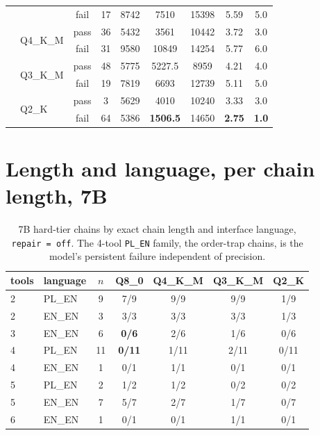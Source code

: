 \documentclass[11pt]{article}
\begin{document}
\begin{table}[h]
\begin{tabular}{llccccccc}
 &                          & fail & 17 & 8742 & 7510 & 15398 & 5.59 & 5.0 \\
 & \multirow{2}{*}{Q4\_K\_M} & pass & 36 & 5432 & 3561 & 10442 & 3.72 & 3.0 \\
 &                          & fail & 31 & 9580 & 10849& 14254 & 5.77 & 6.0 \\
 & \multirow{2}{*}{Q3\_K\_M} & pass & 48 & 5775 & 5227.5 & 8959  & 4.21 & 4.0 \\
 &                          & fail & 19 & 7819 & 6693 & 12739 & 5.11 & 5.0 \\
 & \multirow{2}{*}{Q2\_K}   & pass & 3  & 5629 & 4010 & 10240 & 3.33 & 3.0 \\
 &                          & fail & 64 & 5386 & \textbf{1506.5} & 14650 & \textbf{2.75} & \textbf{1.0} \\
\bottomrule
\end{tabular}
\end{table}

\FloatBarrier
\Needspace*{0.45\textheight}
\section{Length and language, per chain length, 7B}
\label{app:lang}

\begin{table}[h]
\centering\small
\caption{7B hard-tier chains by exact chain length and interface language, \texttt{repair\,=\,off}. The 4-tool \texttt{PL\_EN} family, the order-trap chains, is the model's persistent failure independent of precision.}
\label{tab:lang7b}
\begin{tabular}{llccccc}
\toprule
tools & language & $n$ & Q8\_0 & Q4\_K\_M & Q3\_K\_M & Q2\_K \\
\midrule
2 & PL\_EN & 9  & 7/9  & 9/9  & 9/9  & 1/9 \\
2 & EN\_EN & 3  & 3/3  & 3/3  & 3/3  & 1/3 \\
3 & EN\_EN & 6  & \textbf{0/6}  & 2/6  & 1/6  & 0/6 \\
4 & PL\_EN & 11 & \textbf{0/11} & 1/11 & 2/11 & 0/11 \\
4 & EN\_EN & 1  & 0/1  & 1/1  & 0/1  & 0/1 \\
5 & PL\_EN & 2  & 1/2  & 1/2  & 0/2  & 0/2 \\
5 & EN\_EN & 7  & 5/7  & 2/7  & 1/7  & 0/7 \\
6 & EN\_EN & 1  & 0/1  & 0/1  & 1/1  & 0/1 \\
\bottomrule
\end{tabular}
\end{table}
\end{document}
